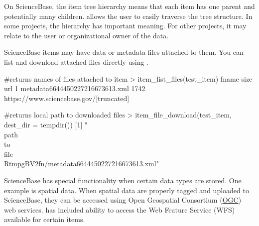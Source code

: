 On ScienceBase, the item tree hierarchy means that each item has one
parent and potentially many children.  allows the user to
easily traverse the tree structure. In some projects, the hierarchy has
important meaning. For other projects, it may relate to the user or
organizational owner of the data.



ScienceBase items may have data or metadata files attached to them.
You can list and download attached files directly using .

\begin{example}
#returns names of files attached to item
> item_list_files(test_item)
                              fname size  url
  1 metadata6644450227216673613.xml 1742  https://www.sciencebase.gov/[truncated]

#returns local path to downloaded files
> item_file_download(test_item, dest_dir = tempdir())
[1] "\\path\\to\\file\\RtmpgBV2fn/metadata6644450227216673613.xml"

\end{example}

ScienceBase has special functionality when certain data types are
stored. One example is spatial data. When spatial data are properly
tagged and uploaded to ScienceBase, they can be accessed using 
Open Geospatial Consortium (\href{http://www.opengeospatial.org/}{OGC}) 
web services.  has included ability to access the Web
Feature Service (WFS) available for certain items.

